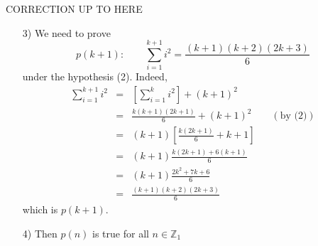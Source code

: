 \documentclass[11pt]{amsbook}
\begin{document}





CORRECTION UP TO HERE


  \begin{enumerate}
    \item[3)] We need to prove
    \[
    p(k+1): \qquad \sum_{i=1}^{k+1} i^2 = \frac{(k+1)(k+2)(2k+3)}{6}
    \]
    under the hypothesis (2). Indeed,
    \begin{eqnarray*}
      \sum_{i=1}^{k+1} i^2 & = & \left[ \sum_{i=1}^{k} i^2 \right] + (k+1)^2 \\
      & = & \frac{k(k+1)(2k+1)}{6} + (k+1)^2 \qquad (\mbox{by (2)})\\
      & = & (k+1) \left[ \frac{k(2k+1)}{6} + k + 1 \right]\\
      & = & (k+1) \frac{k(2k+1)+6(k+1)}{6}\\
      & = & (k+1) \frac{2k^2 + 7k + 6}{6}\\
      & = & \frac{(k+1)(k+2)(2k+3)}{6}
    \end{eqnarray*}
    which is $p(k+1)$.
    \item[4)] Then $p(n)$ is true for all $n \in \mathbb{Z}_1$
  \end{enumerate}
  
\end{document}
